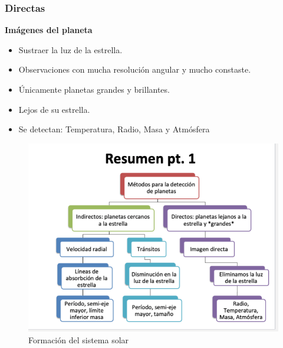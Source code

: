 \documentclass[11pt,fleqn]{book} %
\begin{document}
\subsubsection{Directas}
\textbf{Imágenes del planeta}
\begin{itemize}
    \item Sustraer la luz de la estrella. 
    \item Observaciones con mucha resolución angular y mucho constaste.
    \item Únicamente planetas grandes y brillantes.
    \item Lejos de su estrella. 
    \item Se detectan: Temperatura, Radio, Masa y Atmósfera
\end{itemize}


\begin{figure}[h]
\centering\includegraphics[scale=0.6]{Pictures/exo.png}
\caption{Formación del sistema solar}
\label{fig:placeholder} 
\end{figure}


\cleardoublepage %
\setlength{\columnsep}{0.75cm} %
\printindex %

\end{document}
